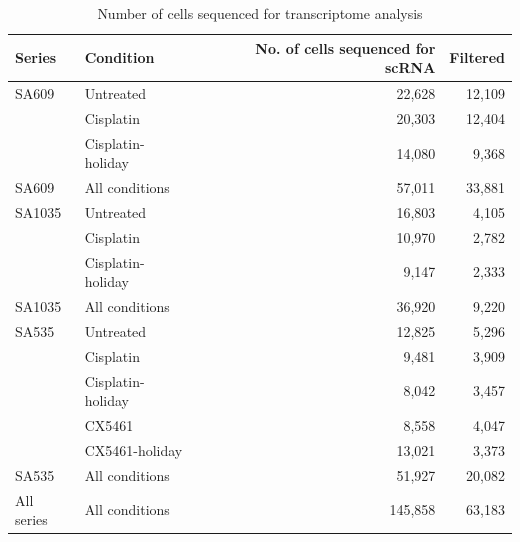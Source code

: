 \begin{table}[htbp]
 \centering
  \caption{Number of cells sequenced for transcriptome analysis}
{
\begin{tabular}{|l|l|r|r|}
\hline
Series & Condition     & No. of cells sequenced for scRNA & Filtered \\
\hline
\hline
SA609 & Untreated & 22,628 & 12,109 \\
 & Cisplatin & 20,303 & 12,404 \\
 & Cisplatin-holiday & 14,080 & 9,368 \\
 \hline
SA609 & All conditions & 57,011 & 33,881 \\
 \hline
 \hline
SA1035 & Untreated & 16,803 & 4,105 \\
 & Cisplatin & 10,970 & 2,782 \\
& Cisplatin-holiday & 9,147 & 2,333 \\ 
\hline
SA1035 & All conditions & 36,920  & 9,220 \\
\hline
\hline
SA535 & Untreated & 12,825 & 5,296\\
 & Cisplatin & 9,481 & 3,909\\
 & Cisplatin-holiday & 8,042 & 3,457\\
 & CX5461 & 8,558 & 4,047\\
 & CX5461-holiday & 13,021 & 3,373\\
 \hline
SA535 & All conditions & 51,927 & 20,082 \\
\hline
\hline

\hline
All series & All conditions          & 145,858                          & 63,183\\
\hline
\end{tabular}%
\label{tab:nofcellsRNA}
}
\end{table}

 

